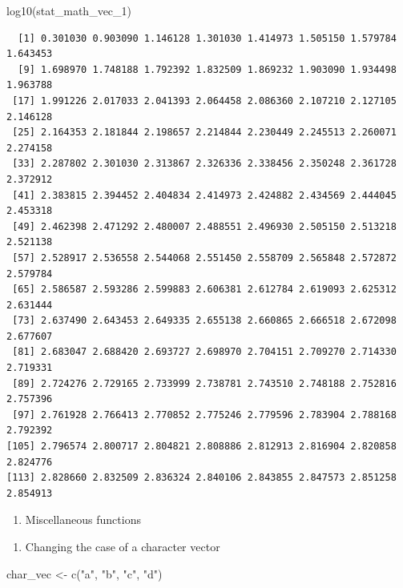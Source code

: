 \documentclass[
  letterpaper,
  DIV=11,
  numbers=noendperiod]{scrreprt}
\newenvironment{Shaded}{\begin{snugshade}}{\end{snugshade}}
\newcommand{\FunctionTok}[1]{\textcolor[rgb]{0.28,0.35,0.67}{#1}}
\newcommand{\NormalTok}[1]{\textcolor[rgb]{0.00,0.23,0.31}{#1}}
\newcommand{\OtherTok}[1]{\textcolor[rgb]{0.00,0.23,0.31}{#1}}
\newcommand{\StringTok}[1]{\textcolor[rgb]{0.13,0.47,0.30}{#1}}
\providecommand{\tightlist}{%
  \setlength{\itemsep}{0pt}\setlength{\parskip}{0pt}}\usepackage{longtable,booktabs,array}
\begin{document}
\begin{Shaded}
\begin{Highlighting}[]
\FunctionTok{log10}\NormalTok{(stat\_math\_vec\_1)}
\end{Highlighting}
\end{Shaded}

\begin{verbatim}
  [1] 0.301030 0.903090 1.146128 1.301030 1.414973 1.505150 1.579784 1.643453
  [9] 1.698970 1.748188 1.792392 1.832509 1.869232 1.903090 1.934498 1.963788
 [17] 1.991226 2.017033 2.041393 2.064458 2.086360 2.107210 2.127105 2.146128
 [25] 2.164353 2.181844 2.198657 2.214844 2.230449 2.245513 2.260071 2.274158
 [33] 2.287802 2.301030 2.313867 2.326336 2.338456 2.350248 2.361728 2.372912
 [41] 2.383815 2.394452 2.404834 2.414973 2.424882 2.434569 2.444045 2.453318
 [49] 2.462398 2.471292 2.480007 2.488551 2.496930 2.505150 2.513218 2.521138
 [57] 2.528917 2.536558 2.544068 2.551450 2.558709 2.565848 2.572872 2.579784
 [65] 2.586587 2.593286 2.599883 2.606381 2.612784 2.619093 2.625312 2.631444
 [73] 2.637490 2.643453 2.649335 2.655138 2.660865 2.666518 2.672098 2.677607
 [81] 2.683047 2.688420 2.693727 2.698970 2.704151 2.709270 2.714330 2.719331
 [89] 2.724276 2.729165 2.733999 2.738781 2.743510 2.748188 2.752816 2.757396
 [97] 2.761928 2.766413 2.770852 2.775246 2.779596 2.783904 2.788168 2.792392
[105] 2.796574 2.800717 2.804821 2.808886 2.812913 2.816904 2.820858 2.824776
[113] 2.828660 2.832509 2.836324 2.840106 2.843855 2.847573 2.851258 2.854913
\end{verbatim}

\begin{enumerate}
\def\labelenumi{\arabic{enumi}.}
\setcounter{enumi}{3}
\tightlist
\item
  Miscellaneous functions
\end{enumerate}

\begin{enumerate}
\def\labelenumi{\alph{enumi}.}
\tightlist
\item
  Changing the case of a character vector
\end{enumerate}

\begin{Shaded}
\begin{Highlighting}[]
\NormalTok{char\_vec }\OtherTok{\textless{}{-}} \FunctionTok{c}\NormalTok{(}\StringTok{"a"}\NormalTok{, }\StringTok{"b"}\NormalTok{, }\StringTok{"c"}\NormalTok{, }\StringTok{"d"}\NormalTok{)}
\end{Highlighting}
\end{Shaded}
\end{document}
